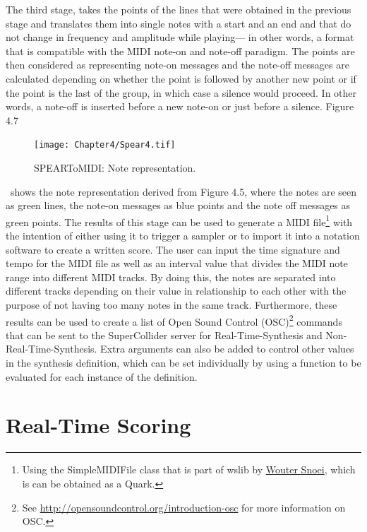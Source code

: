 The third stage, takes the points of the lines that were obtained in the previous stage and translates them into single notes with a start and an end and that do not change in frequency and amplitude while playing--- in other words, a format that is compatible with the MIDI note-on and note-off paradigm. The points are then considered as representing note-on messages and the note-off messages are calculated depending on whether the point is followed by another new point or if the point is the last of the group, in which case a silence would proceed. In other words, a note-off is inserted before a new note-on or just before a silence. Figure 4.7 
\begin{figure}[htbp] %
   \centering
   \texttt{[image: Chapter4/Spear4.tif]} %
   \caption{SPEARToMIDI: Note representation.}
   \label{fig:example}
\end{figure}\
shows the note representation derived from Figure 4.5, where the notes are seen as green lines, the note-on messages as blue points and the note off messages as green points. 
The results of this stage can be used to generate a MIDI file\hypertarget{wlib}{}\footnote{Using the SimpleMIDIFile class that is part of wslib by \href{http://www.woutersnoei.nl/}{Wouter Snoei}, which is can be obtained as a Quark.} with the intention of either using it to trigger a sampler or to import it into a notation software to create a written score. The user can input the time signature and tempo for the MIDI file as well as an interval value that divides the MIDI note range into different MIDI tracks. By doing this, the notes are separated into different tracks depending on their value in relationship to each other with the purpose of not having too many notes in the same track. Furthermore, these results can be used to create a list of Open Sound Control (OSC)\footnote{See \href{http://opensoundcontrol.org/introduction-osc}{http://opensoundcontrol.org/introduction-osc} for more information on OSC.} commands that can be sent to the SuperCollider server for Real-Time-Synthesis and Non-Real-Time-Synthesis. Extra arguments can also be added to control other values in the synthesis definition, which can be set individually by using a function to be evaluated for each instance of the definition.

\section{Real-Time Scoring}

